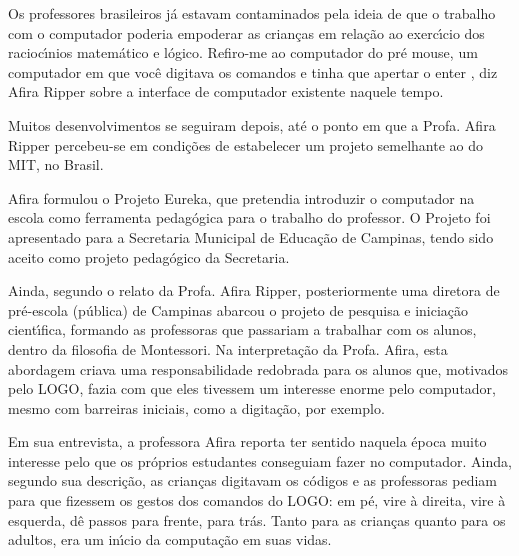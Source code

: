 \documentclass[
12pt,		%
openright,	%
twoside,  %
a4paper,			%
chapter=TITLE,		%
english,			%
french,				%
spanish,			%
brazil				%
]{USPSC-classe/USPSC}
\begin{document}
Os professores brasileiros j\'a estavam contaminados pela ideia de que o trabalho com o computador poderia empoderar as crian\c{c}as em rela\c{c}\~ao ao exerc\'{\i}cio dos racioc\'{\i}nios matem\'atico e l\'ogico. \textquotedbl Refiro-me ao computador do pr\'e mouse, um computador em que voc\^e digitava os comandos e tinha que apertar o enter \textquotedbl , diz Afira Ripper sobre a interface de computador existente naquele tempo.









Muitos desenvolvimentos se seguiram depois, at\'e o ponto em que a Profa. Afira Ripper percebeu-se em condi\c{c}\~oes de estabelecer um projeto semelhante ao do MIT, no Brasil.









Afira formulou o Projeto Eureka, que pretendia introduzir o computador na escola como ferramenta pedag\'ogica para o trabalho do professor. O Projeto foi apresentado para a Secretaria Municipal de Educa\c{c}\~ao de Campinas, tendo sido aceito como projeto pedag\'ogico da Secretaria.









Ainda, segundo o relato da Profa. Afira Ripper, posteriormente uma diretora de pr\'e-escola (p\'ublica) de Campinas abarcou o projeto de pesquisa e inicia\c{c}\~ao cient\'{\i}fica, formando as professoras que passariam a trabalhar com os alunos, dentro da filosofia de Montessori. Na interpreta\c{c}\~ao da Profa. Afira, esta abordagem criava uma responsabilidade redobrada para os alunos que, motivados pelo LOGO, fazia com que eles tivessem um interesse enorme pelo computador, mesmo com barreiras iniciais, como a digita\c{c}\~ao, por exemplo.









Em sua entrevista, a professora Afira reporta ter sentido naquela \'epoca muito interesse pelo que os pr\'oprios estudantes conseguiam fazer no computador. Ainda, segundo sua descri\c{c}\~ao, as crian\c{c}as digitavam os c\'odigos e as professoras pediam para que fizessem os gestos dos comandos do LOGO: \textquotedbl em p\'e\textquotedbl , \textquotedbl vire \`a direita\textquotedbl , \textquotedbl vire \`a esquerda\textquotedbl , \textquotedbl d\^e passos para frente\textquotedbl , \textquotedbl para tr\'as\textquotedbl . Tanto para as crian\c{c}as quanto para os adultos, era um in\'{\i}cio da computa\c{c}\~ao em suas vidas.
\end{document}
